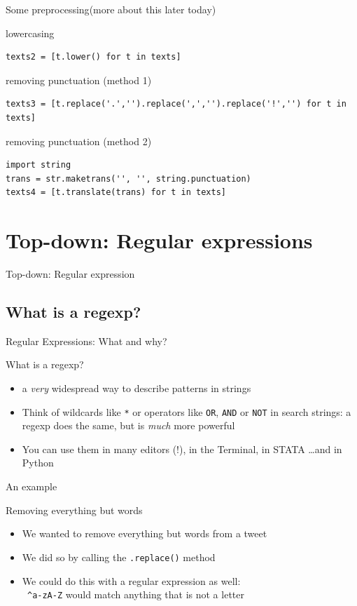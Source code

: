 \documentclass{beamer}
\begin{document}
\begin{frame}[fragile]{Some preprocessing}{(more about this later today)}


lowercasing
\begin{lstlisting}
texts2 = [t.lower() for t in texts]
\end{lstlisting}

removing punctuation (method 1)
\begin{lstlisting}
texts3 = [t.replace('.','').replace(',','').replace('!','') for t in texts]   
\end{lstlisting}

removing punctuation (method 2)
\begin{lstlisting}
import string
trans = str.maketrans('', '', string.punctuation)
texts4 = [t.translate(trans) for t in texts]   
\end{lstlisting}
\end{frame}

\section{Top-down: Regular expressions}
\begin{frame}[plain]
Top-down: Regular expression
\end{frame}



\subsection{What is a regexp?}
\begin{frame}{Regular Expressions: What and why?}
\begin{block}{What is a regexp?}
	\begin{itemize}
		\item<1-> a \emph{very} widespread way to describe patterns in strings
		\item<2-> Think of wildcards like {\tt{*}} or operators like {\tt{OR}}, {\tt{AND}} or {\tt{NOT}} in search strings: a regexp does the same, but is \emph{much} more powerful
		\item<3-> You can use them in many editors (!), in the Terminal, in STATA \ldots and in Python
	\end{itemize}
\end{block}
\end{frame}

\begin{frame}{An example}
\begin{block}{Removing everything but words}
\begin{itemize}
	\item We wanted to remove everything but words from a tweet
	\item We did so by calling the \texttt{.replace()} method
	\item We could do this with a regular expression as well: \\
	{\tt{ \lbrack \^{}a-zA-Z\rbrack}} would match anything that is not a letter
\end{itemize}
\end{block}
\end{frame}
\end{document}
